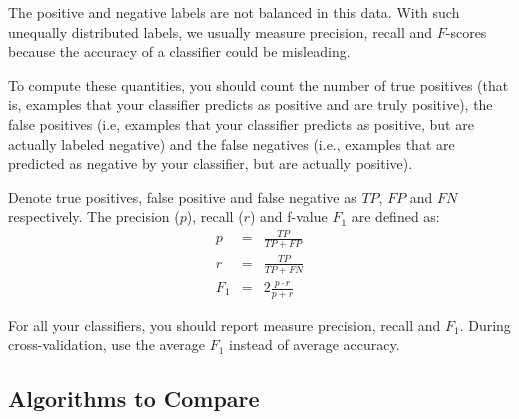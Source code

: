 The positive and negative labels are not balanced in this data. With
such unequally distributed labels, we usually measure precision,
recall and $F$-scores because the accuracy of a classifier could be
misleading. 

To compute these quantities, you should count the number of true
positives (that is, examples that your classifier predicts as
positive and are truly positive), the false positives (i.e, examples
that your classifier predicts as positive, but are actually labeled
negative) and the false negatives (i.e., examples that are predicted
as negative by your classifier, but are actually positive).

Denote true positives, false positive and false negative as $TP$, $FP$
and $FN$ respectively. The precision ($p$), recall ($r$) and f-value
$F_1$ are defined as:
\begin{eqnarray*}
  p   & = & \frac{TP}{TP + FP} \\
  r   & = & \frac{TP}{TP+FN}   \\
  F_1 & = & 2 \frac{p \cdot r}{p + r} 
\end{eqnarray*}

For all your classifiers, you should report measure precision,
recall and $F_1$. During cross-validation, use the average $F_1$
instead of average accuracy.


\subsection{Algorithms to Compare}

